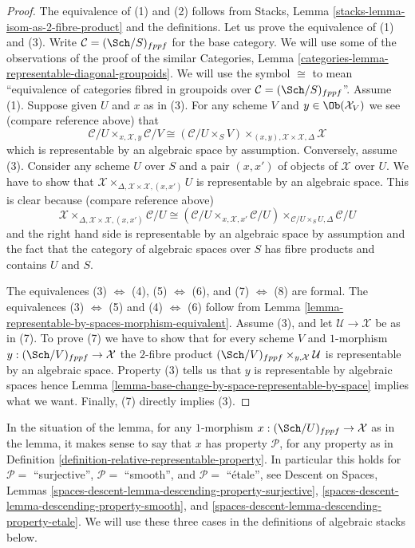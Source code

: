 \begin{proof}
The equivalence of (1) and (2) follows from
Stacks, Lemma \ref{stacks-lemma-isom-as-2-fibre-product}
and the definitions.
Let us prove the equivalence of (1) and (3).
Write $\mathcal{C} = (\Sch/S)_{fppf}$ for the base category.
We will use some of the observations of the proof of the similar
Categories, Lemma \ref{categories-lemma-representable-diagonal-groupoids}.
We will use the symbol $\cong$ to mean ``equivalence of categories fibred
in groupoids over $\mathcal{C} = (\Sch/S)_{fppf}$''.
Assume (1). Suppose given $U$ and $x$ as in (3). For any scheme $V$
and $y \in \Ob(\mathcal{X}_V)$ we see (compare reference above) that
$$
\mathcal{C}/U
\times_{x, \mathcal{X}, y}
\mathcal{C}/V
\cong
(\mathcal{C}/U \times_S V)
\times_{(x, y), \mathcal{X} \times \mathcal{X}, \Delta}
\mathcal{X}
$$
which is representable by an algebraic space by assumption. Conversely,
assume (3). Consider any scheme $U$ over $S$ and a pair $(x, x')$
of objects of $\mathcal{X}$ over $U$. We have to show that
$\mathcal{X} \times_{\Delta, \mathcal{X} \times \mathcal{X}, (x, x')} U$
is representable by an algebraic space. This is clear because
(compare reference above)
$$
\mathcal{X}
\times_{\Delta, \mathcal{X} \times \mathcal{X}, (x, x')}
\mathcal{C}/U
\cong
(\mathcal{C}/U \times_{x, \mathcal{X}, x'} \mathcal{C}/U)
\times_{\mathcal{C}/U \times_S U, \Delta}
\mathcal{C}/U
$$
and the right hand side is representable by an algebraic space by assumption
and the fact that the category of algebraic spaces over $S$ has fibre products
and contains $U$ and $S$.

\medskip\noindent
The equivalences
(3) $\Leftrightarrow$ (4),
(5) $\Leftrightarrow$ (6),
and
(7) $\Leftrightarrow$ (8)
are formal. The equivalences
(3) $\Leftrightarrow$ (5) and
(4) $\Leftrightarrow$ (6)
follow from
Lemma \ref{lemma-representable-by-spaces-morphism-equivalent}.
Assume (3), and let $\mathcal{U} \to \mathcal{X}$ be as in (7).
To prove (7) we have to show that for every scheme $V$ and $1$-morphism
$y : (\Sch/V)_{fppf} \to \mathcal{X}$ the $2$-fibre product
$(\Sch/V)_{fppf} \times_{y, \mathcal{X}} \mathcal{U}$
is representable by an algebraic space. Property (3) tells us
that $y$ is representable by algebraic spaces hence
Lemma \ref{lemma-base-change-by-space-representable-by-space}
implies what we want. Finally, (7) directly implies (3).
\end{proof}

\noindent
In the situation of the lemma, for any $1$-morphism
$x : (\Sch/U)_{fppf} \to \mathcal{X}$ as in the lemma, it makes sense
to say that $x$ has property $\mathcal{P}$, for any property as in
Definition \ref{definition-relative-representable-property}.
In particular this holds for
$\mathcal{P} = $ ``surjective'',
$\mathcal{P} = $ ``smooth'', and
$\mathcal{P} = $ ``\'etale'',
see
Descent on Spaces,
Lemmas \ref{spaces-descent-lemma-descending-property-surjective},
\ref{spaces-descent-lemma-descending-property-smooth}, and
\ref{spaces-descent-lemma-descending-property-etale}.
We will use these three cases in the definitions
of algebraic stacks below.








